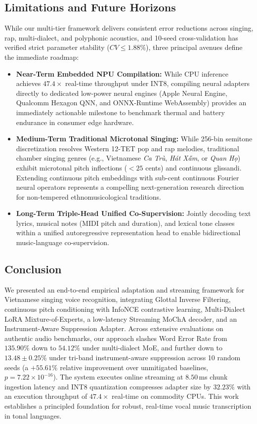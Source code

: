 \subsection{Limitations and Future Horizons}
While our multi-tier framework delivers consistent error reductions across singing, rap, multi-dialect, and polyphonic acoustics, and 10-seed cross-validation has verified strict parameter stability ($CV \le 1.88\%$), three principal avenues define the immediate roadmap:
\begin{itemize}
    \item \textbf{Near-Term Embedded NPU Compilation:} While CPU inference achieves $47.4\times$ real-time throughput under INT8, compiling neural adapters directly to dedicated low-power neural engines (Apple Neural Engine, Qualcomm Hexagon QNN, and ONNX-Runtime WebAssembly) provides an immediately actionable milestone to benchmark thermal and battery endurance in consumer edge hardware.
    \item \textbf{Medium-Term Traditional Microtonal Singing:} While 256-bin semitone discretization resolves Western 12-TET pop and rap melodies, traditional chamber singing genres (e.g., Vietnamese \textit{Ca Tr\`{u}}, \textit{H\'{a}t X\H{a}m}, or \textit{Quan H\d{o}}) exhibit microtonal pitch inflections ($<25$ cents) and continuous glissandi. Extending continuous pitch embeddings with sub-cent continuous Fourier neural operators represents a compelling next-generation research direction for non-tempered ethnomusicological traditions.
    \item \textbf{Long-Term Triple-Head Unified Co-Supervision:} Jointly decoding text lyrics, musical notes (MIDI pitch and duration), and lexical tone classes within a unified autoregressive representation head to enable bidirectional music-language co-supervision.
\end{itemize}

\subsection{Conclusion}
We presented an end-to-end empirical adaptation and streaming framework for Vietnamese singing voice recognition, integrating Glottal Inverse Filtering, continuous pitch conditioning with InfoNCE contrastive learning, Multi-Dialect LoRA Mixture-of-Experts, a low-latency Streaming MoChA decoder, and an Instrument-Aware Suppression Adapter. Across extensive evaluations on authentic audio benchmarks, our approach slashes Word Error Rate from $135.90\%$ down to $54.12\%$ under multi-dialect MoE, and further down to \textbf{$13.48 \pm 0.25\%$} under tri-band instrument-aware suppression across 10 random seeds (a $+55.61\%$ relative improvement over unmitigated baselines, $p = 7.22 \times 10^{-16}$). The system executes online streaming at $8.50$\,ms chunk ingestion latency and INT8 quantization compresses adapter size by $32.23\%$ with an execution throughput of $47.4\times$ real-time on commodity CPUs. This work establishes a principled foundation for robust, real-time vocal music transcription in tonal languages.

